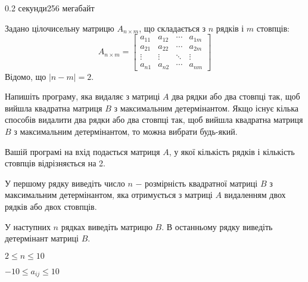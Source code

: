 \begin{problem}{}{}{}{0.2 секунди}{256 мегабайт}

Задано цілочисельну матрицю $A_{n\times m}$, що складається з $n$ рядків і $m$ стовпців:
$$
A_{n\times m} = \begin{bmatrix}
a_{11} & a_{12} & \cdots & a_{1m} \\
a_{21} & a_{22} & \cdots & a_{2m} \\
\vdots & \vdots & \ddots & \vdots \\
a_{n1} & a_{n2} & \cdots & a_{nm}
\end{bmatrix}
$$
Відомо, що $|n - m| = 2$.

Напишіть програму, яка видаляє з матриці $A$ два рядки або два стовпці так, щоб вийшла квадратна матриця $B$ з максимальним детермінантом.
Якщо існує кілька способів видалити два рядки або два стовпці так, щоб вийшла квадратна матриця $B$ з максимальним детермінантом, то можна вибрати будь-який.


\InputFile
Вашій програмі на вхід подається матриця $A$, у якої кількість рядків і кількість стовпців відрізняється на 2.

\OutputFile
У першому рядку виведіть число $n$ $-$ розмірність квадратної матриці $B$ з максимальним детермінантом, 
яка отримується з матриці $A$ видаленням двох рядків або двох стовпців. 

У наступних $n$ рядках виведіть матрицю $B$.
В останньому рядку виведіть детермінант матриці $B$.

\Constraints

$2 \le n \le 10$

$-10 \le a_{ij} \le 10$

\Examples
\begin{example}
%
%
\end{example}

\end{problem}

